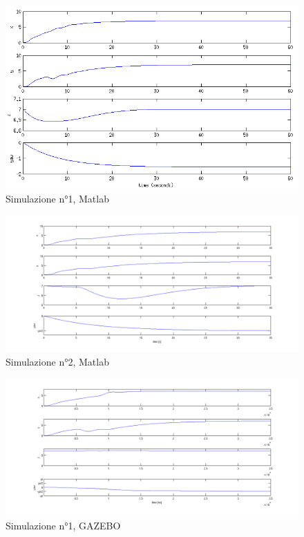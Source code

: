 \documentclass[a4paper,10pt]{article}
\begin{document}
\newpage
\begin{figure}[p]
\hspace*{-1.5cm}
\begin{center}
\includegraphics[scale=0.5]{img/plot/matlab/simulation1.png}
\caption{Simulazione n°1, Matlab}
\label{sim:1M}
\end{center}
\end{figure}

\begin{figure}[p]
\hspace*{-3.5cm}
\includegraphics[scale=0.5]{img/plot/matlab/sim2_pdf.png}
\caption{Simulazione n°2, Matlab}
\label{sim:2M}
\end{figure}

\begin{figure}[p]
\hspace*{-3.5cm}
\includegraphics[scale=0.5]{img/plot/gazebo/simulazione1_pdf.png}
\caption{Simulazione n°1, GAZEBO}
\label{sim:1G}
\end{figure}
\end{document}
